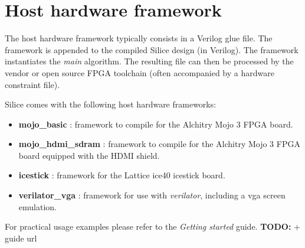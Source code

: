 \documentclass[a4]{article}
\newcommand\todo[1]{{\color{magenta}\textbf{TODO:} #1}}
\newcommand\verilog{Verilog}
\newcommand\silice{Silice}
\begin{document}

\section{Host hardware framework}
\label{sec:host}

The host hardware framework typically consists in a \verilog{} glue file. The framework is appended to the compiled \silice{} design (in \verilog{}). The framework instantiates the \textit{main} algorithm. The resulting file can then be processed by the vendor or open source FPGA toolchain (often accompanied by a hardware constraint file).

\silice{} comes with the following host hardware frameworks:
\begin{itemize}
	\item \textbf{mojo\_basic} : framework to compile for the Alchitry Mojo 3 FPGA board.
	\item \textbf{mojo\_hdmi\_sdram} : framework to compile for the Alchitry Mojo 3 FPGA board equipped with the HDMI shield.
	\item \textbf{icestick} : framework for the Lattice ice40 icestick board.
	\item \textbf{verilator\_vga} : framework for use with \textit{verilator}, including a vga screen emulation.
\end{itemize}

For practical usage examples please refer to the \textit{Getting started} guide. \todo{ + guide url}

	
\end{document}
